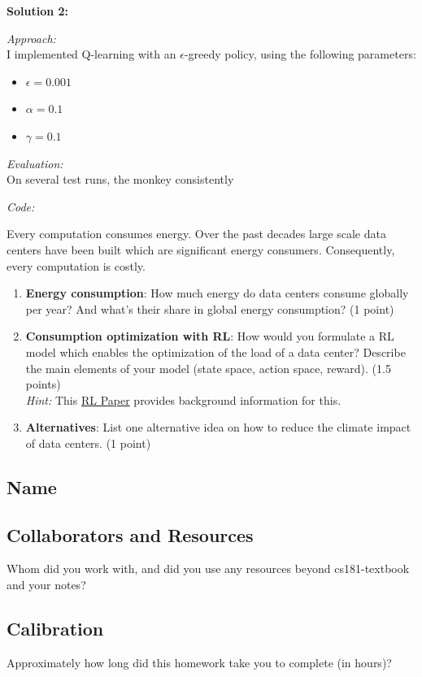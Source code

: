 \documentclass[submit]{harvardml}
\begin{document}
\textbf{Solution 2:}

\emph{Approach:} \\

I implemented Q-learning with an $\epsilon$-greedy policy, using the following parameters:

\begin{itemize}
    \item $\epsilon = 0.001$
    \item $\alpha = 0.1$
    \item $\gamma = 0.1$
\end{itemize}

\emph{Evaluation:}\\

On several test runs, the monkey consistently 

\emph{Code:}


\newpage
\begin{problem}
Every computation consumes energy. Over the past decades large scale data centers have been built which are significant energy consumers. Consequently, every computation is costly.  

\begin{enumerate}
    \item \textbf{Energy consumption}: How much energy do data centers consume globally per year? And what's their share in global energy consumption? (1 point)
    \item \textbf{Consumption optimization with RL}: How would you formulate a RL model which enables the optimization of the load of a data center? Describe the main elements of your model (state space, action space, reward). (1.5 points)\\
   \textit{Hint:} This \href{https://people.csail.mit.edu/alizadeh/papers/deeprm-hotnets16.pdf}{RL Paper} provides background information for this.
   \item \textbf{Alternatives}: List one alternative idea on how to reduce the climate impact of data centers. (1 point)
\end{enumerate}
\end{problem}
    
\newpage
\subsection*{Name}
\subsection*{Collaborators and Resources}
Whom did you work with, and did you use any resources beyond cs181-textbook and your notes?
\subsection*{Calibration}
Approximately how long did this homework take you to complete (in hours)? 
\end{document}
